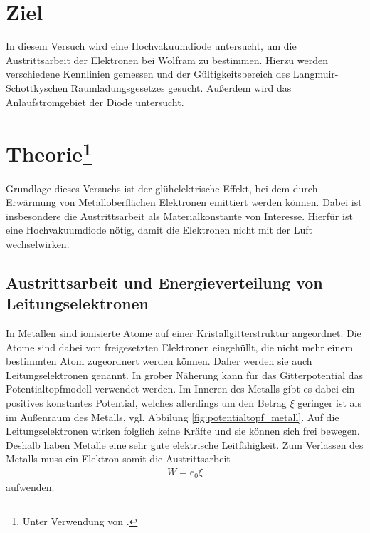 \section{Ziel}
In diesem Versuch wird eine Hochvakuumdiode untersucht, um  die Austrittsarbeit der Elektronen bei Wolfram zu bestimmen.
Hierzu werden verschiedene Kennlinien gemessen und der Gültigkeitsbereich des Langmuir-Schottkyschen Raumladungsgesetzes gesucht.
Außerdem wird das Anlaufstromgebiet der Diode untersucht.






\section[Theorie]{Theorie\footnote[1]{Unter Verwendung von \cite{man:v504}.}}

Grundlage dieses Versuchs ist der glühelektrische Effekt, bei dem durch Erwärmung von Metalloberflächen Elektronen emittiert werden können.
Dabei ist insbesondere die Austrittsarbeit als Materialkonstante von Interesse.
Hierfür ist eine Hochvakuumdiode nötig, damit die Elektronen nicht mit der Luft wechselwirken.



\subsection{Austrittsarbeit und Energieverteilung von Leitungselektronen}
In Metallen sind ionisierte Atome auf einer Kristallgitterstruktur angeordnet.
Die Atome sind dabei von freigesetzten Elektronen eingehüllt, die nicht mehr einem bestimmten Atom zugeordnert werden können.
Daher werden sie auch Leitungselektronen genannt.
In grober Näherung kann für das Gitterpotential das Potentialtopfmodell verwendet werden.
Im Inneren des Metalls gibt es dabei ein positives konstantes Potential, welches allerdings um den Betrag $\xi$ geringer ist als im Außenraum des Metalls, vgl. Abbilung \ref{fig:potentialtopf_metall}.
Auf die Leitungselektronen wirken folglich keine Kräfte und sie können sich frei bewegen.
Deshalb haben Metalle eine sehr gute elektrische Leitfähigkeit.
Zum Verlassen des Metalls muss ein Elektron somit die Austrittsarbeit
\begin{align}
    W = e_0 \xi %
    \label{eq:austrittsarbeit}
\end{align}
aufwenden.

